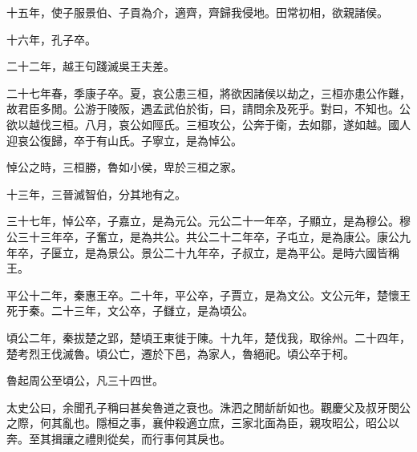 十五年，使子服景伯、子貢為介，適齊，齊歸我侵地。田常初相，欲親諸侯。

十六年，孔子卒。

二十二年，越王句踐滅吳王夫差。

二十七年春，季康子卒。夏，哀公患三桓，將欲因諸侯以劫之，三桓亦患公作難，故君臣多閒。公游于陵阪，遇孟武伯於街，曰，請問余及死乎。對曰，不知也。公欲以越伐三桓。八月，哀公如陘氏。三桓攻公，公奔于衛，去如鄒，遂如越。國人迎哀公復歸，卒于有山氏。子寧立，是為悼公。

悼公之時，三桓勝，魯如小侯，卑於三桓之家。

十三年，三晉滅智伯，分其地有之。

三十七年，悼公卒，子嘉立，是為元公。元公二十一年卒，子顯立，是為穆公。穆公三十三年卒，子奮立，是為共公。共公二十二年卒，子屯立，是為康公。康公九年卒，子匽立，是為景公。景公二十九年卒，子叔立，是為平公。是時六國皆稱王。

平公十二年，秦惠王卒。二十年，平公卒，子賈立，是為文公。文公元年，楚懷王死于秦。二十三年，文公卒，子讎立，是為頃公。

頃公二年，秦拔楚之郢，楚頃王東徙于陳。十九年，楚伐我，取徐州。二十四年，楚考烈王伐滅魯。頃公亡，遷於下邑，為家人，魯絕祀。頃公卒于柯。

魯起周公至頃公，凡三十四世。

太史公曰，余聞孔子稱曰甚矣魯道之衰也。洙泗之閒龂龂如也。觀慶父及叔牙閔公之際，何其亂也。隱桓之事，襄仲殺適立庶，三家北面為臣，親攻昭公，昭公以奔。至其揖讓之禮則從矣，而行事何其戾也。